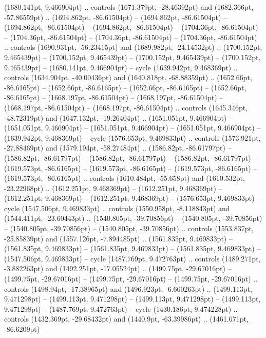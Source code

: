 (1680.141pt, 9.466904pt) .. controls (1671.379pt, -28.46392pt) and (1682.366pt, -57.86559pt) .. (1694.862pt, -86.61504pt)
 -- (1694.862pt, -86.61504pt)
 -- (1694.862pt, -86.61504pt)
 -- (1694.862pt, -86.61504pt)
 -- (1704.36pt, -86.61504pt)
 -- (1704.36pt, -86.61504pt)
 -- (1704.36pt, -86.61504pt)
 -- (1704.36pt, -86.61504pt) .. controls (1690.931pt, -56.23415pt) and (1689.982pt, -24.14532pt) .. (1700.152pt, 9.465439pt)
 -- (1700.152pt, 9.465439pt)
 -- (1700.152pt, 9.465439pt)
 -- (1700.152pt, 9.465439pt)
 -- (1680.141pt, 9.466904pt) -- cycle
(1639.942pt, 9.468369pt) .. controls (1634.904pt, -40.00436pt) and (1640.818pt, -68.88359pt) .. (1652.66pt, -86.6165pt)
 -- (1652.66pt, -86.6165pt)
 -- (1652.66pt, -86.6165pt)
 -- (1652.66pt, -86.6165pt)
 -- (1668.197pt, -86.61504pt)
 -- (1668.197pt, -86.61504pt)
 -- (1668.197pt, -86.61504pt)
 -- (1668.197pt, -86.61504pt) .. controls (1645.346pt, -48.72319pt) and (1647.132pt, -19.26404pt) .. (1651.051pt, 9.466904pt)
 -- (1651.051pt, 9.466904pt)
 -- (1651.051pt, 9.466904pt)
 -- (1651.051pt, 9.466904pt)
 -- (1639.942pt, 9.468369pt) -- cycle
(1576.653pt, 9.469833pt) .. controls (1573.921pt, -27.88469pt) and (1579.194pt, -58.27484pt) .. (1586.82pt, -86.61797pt)
 -- (1586.82pt, -86.61797pt)
 -- (1586.82pt, -86.61797pt)
 -- (1586.82pt, -86.61797pt)
 -- (1619.573pt, -86.6165pt)
 -- (1619.573pt, -86.6165pt)
 -- (1619.573pt, -86.6165pt)
 -- (1619.573pt, -86.6165pt) .. controls (1610.484pt, -55.658pt) and (1610.532pt, -23.22968pt) .. (1612.251pt, 9.468369pt)
 -- (1612.251pt, 9.468369pt)
 -- (1612.251pt, 9.468369pt)
 -- (1612.251pt, 9.468369pt)
 -- (1576.653pt, 9.469833pt) -- cycle
(1547.506pt, 9.469833pt) .. controls (1550.958pt, -8.118843pt) and (1544.411pt, -23.60443pt) .. (1540.805pt, -39.70856pt)
 -- (1540.805pt, -39.70856pt)
 -- (1540.805pt, -39.70856pt)
 -- (1540.805pt, -39.70856pt) .. controls (1553.837pt, -25.85839pt) and (1557.126pt, -7.894485pt) .. (1561.835pt, 9.469833pt)
 -- (1561.835pt, 9.469833pt)
 -- (1561.835pt, 9.469833pt)
 -- (1561.835pt, 9.469833pt)
 -- (1547.506pt, 9.469833pt) -- cycle
(1487.769pt, 9.472763pt) .. controls (1489.271pt, -3.882263pt) and (1492.251pt, -17.05524pt) .. (1499.75pt, -29.67016pt)
 -- (1499.75pt, -29.67016pt)
 -- (1499.75pt, -29.67016pt)
 -- (1499.75pt, -29.67016pt) .. controls (1498.94pt, -17.38965pt) and (1496.923pt, -6.660263pt) .. (1499.113pt, 9.471298pt)
 -- (1499.113pt, 9.471298pt)
 -- (1499.113pt, 9.471298pt)
 -- (1499.113pt, 9.471298pt)
 -- (1487.769pt, 9.472763pt) -- cycle
(1430.186pt, 9.474228pt) .. controls (1432.369pt, -29.68432pt) and (1440.9pt, -63.39986pt) .. (1461.671pt, -86.6209pt)
